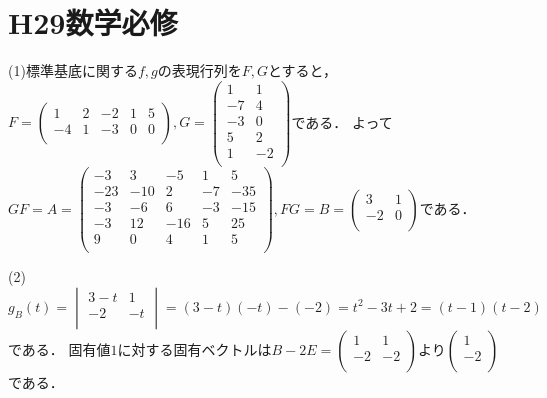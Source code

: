 \documentclass[
		book,
		head_space=20mm,
		foot_space=20mm,
		gutter=10mm,
		line_length=190mm
]{jlreq}
\begin{document}
\section{H29数学必修}
(1)標準基底に関する$f,g$の表現行列を$F,G$とすると，$F=\begin{pmatrix}
    1 & 2 & -2 & 1 & 5\\
    -4 & 1 & -3 & 0 & 0 \\
    \end{pmatrix},G=\begin{pmatrix}
        1 & 1 \\
        -7 & 4 \\
        -3 & 0 \\
        5  & 2 \\
        1 & -2 \\
    \end{pmatrix}$である．
    よって$GF=A=\begin{pmatrix}
        -3 & 3 & -5 & 1 & 5 \\
        -23 & -10 & 2 & -7 & -35 \\
        -3 & -6 & 6 & -3 & -15 \\
        -3 & 12 & -16 & 5 & 25 \\
        9 & 0 & 4 & 1 & 5 \\
    \end{pmatrix},FG=B=\begin{pmatrix}
        3 & 1 \\
        -2 & 0 \\
        \end{pmatrix}$である．

    (2)$g_B(t)=\begin{vmatrix}
        3-t & 1 \\
        -2 & -t \\
    \end{vmatrix}=(3-t)(-t)-(-2)=t^2-3t+2=(t-1)(t-2)$である．
    固有値$1$に対する固有ベクトルは$B-2E=\begin{pmatrix}
        1 & 1 \\
        -2 & -2 \\
        \end{pmatrix}$より$\begin{pmatrix}
            1 \\
            -2 \\
        \end{pmatrix}$である．
\end{document}
